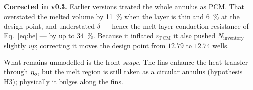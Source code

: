 \medskip
\noindent\textbf{Corrected in v0.3.} Earlier versions treated the whole annulus
as PCM. That overstated the melted volume by \SI{11}{\percent} when the layer is
thin and \SI{6}{\percent} at the design point, and understated $\delta$ ---
hence the melt-layer conduction resistance of Eq.~\eqref{eq:he} --- by up to
\SI{34}{\percent}. Because it inflated $\varepsilon_{\mathrm{PCM}}$ it also
pushed $N_{\mathrm{inventory}}$ slightly \emph{up}; correcting it moves the
design point from $12.79$ to $12.74$ wells.

What remains unmodelled is the front \emph{shape}. The fins enhance the heat
transfer through $\eta_{o}$, but the melt region is still taken as a circular
annulus (hypothesis H3); physically it bulges along the fins.

